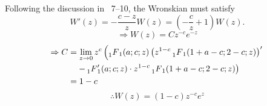 \item

Following the discussion in ~7--10, the Wronskian must satisfy
\[
    W'(z)
    = -\frac{c - z}{z} W(z)
    = \left( -\frac{c}{z} + 1 \right) W(z).
\]
\[
    \Rightarrow W(z)
    = C z^{-c} e^{-z}
\]
\begin{align*}
    \Rightarrow C
    &= \lim_{z \rightarrow 0} z^c \left(
        \prescript{}{1}{F}_{1} (a; c; z) \left(
            z^{1 - c} \prescript{}{1}{F}_{1} (1 + a - c; 2 - c; z)
        \right)'
    \right. \\
    &\quad \left.
        - \prescript{}{1}{F}_{1}' (a; c; z) \cdot z^{1 - c} \prescript{}{1}{F}_{1} (1 + a - c; 2 - c; z)
    \right) \\
    &= 1 - c
\end{align*}
\[
    \therefore W(z) = (1 - c) z^{-c} e^z
\]
